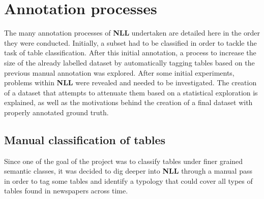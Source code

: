 

\section{Annotation processes}
\label{annotation_processes}
The many annotation processes of \textbf{NLL} undertaken are detailed here in the order they were conducted. Initially, a subset had to be classified in order to tackle the task of table classification. After this initial annotation, a process to increase the size of the already labelled dataset by automatically tagging tables based on the previous manual annotation was explored. After some initial experiments, problems within \textbf{NLL} were revealed and needed to be investigated. The creation of a dataset that attempts to attenuate them based on a statistical exploration is explained, as well as the motivations behind the creation of a final dataset with properly annotated ground truth.

\subsection{Manual classification of tables}
\label{manual_classification_of_tables}
Since one of the goal of the project was to classify tables under finer grained semantic classes, it was decided to dig deeper into \textbf{NLL} through a manual pass in order to tag some tables and identify a typology that could cover all types of tables found in newspapers across time.

